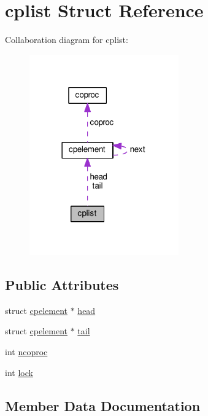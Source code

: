 \hypertarget{structcplist}{}\section{cplist Struct Reference}
\label{structcplist}


Collaboration diagram for cplist\+:
\nopagebreak
\begin{figure}[H]
\begin{center}
\leavevmode
\includegraphics[width=182pt]{structcplist__coll__graph}
\end{center}
\end{figure}
\subsection*{Public Attributes}
\begin{DoxyCompactItemize}
\item 
struct \hyperlink{structcpelement}{cpelement} $\ast$ \hyperlink{structcplist_a0dbec638f97dd68d63b04c47de978763}{head}
\item 
struct \hyperlink{structcpelement}{cpelement} $\ast$ \hyperlink{structcplist_afea07987e8c9d05612ab196a2eac3514}{tail}
\item 
int \hyperlink{structcplist_aafa9e610a74bb2edf40e2f227f03928d}{ncoproc}
\item 
int \hyperlink{structcplist_aa737a27d76b31857c0d7024665731a68}{lock}
\end{DoxyCompactItemize}


\subsection{Member Data Documentation}
